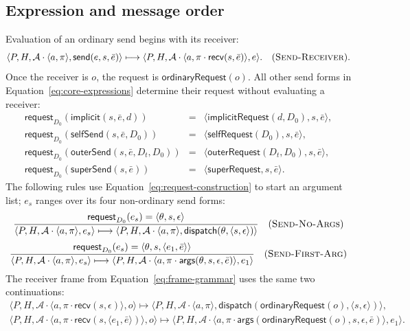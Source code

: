 \documentclass[11pt]{article}
\numberwithin{equation}{section}
\newcommand{\kw}[1]{\ensuremath{\mathsf{#1}}}
\newcommand{\rulelabel}[1]{\textsc{#1}}
\begin{document}
\subsection{Expression and message order}

Evaluation of an ordinary send begins with its receiver:
\[
 \langle P,H,\mathcal A\cdot\langle a,\pi\rangle,
        \kw{send}(e,s,\bar e)\rangle
 \longmapsto
 \langle P,H,\mathcal A\cdot\langle a,\pi\cdot\kw{recv}(s,\bar e)\rangle,
        e\rangle.
 \quad(\rulelabel{Send-Receiver}).
\]
Once the receiver is $o$, the request is $\kw{ordinaryRequest}(o)$.  All other send
forms in Equation~\eqref{eq:core-expressions} determine their request without
evaluating a receiver:
\begin{equation}\label{eq:request-construction}
\begin{array}{rcl}
 \mathsf{request}_{D_0}(\kw{implicit}(s,\bar e,d))
   &=&\langle\kw{implicitRequest}(d,D_0),s,\bar e\rangle,\\
 \mathsf{request}_{D_0}(\kw{selfSend}(s,\bar e,D_0))
   &=&\langle\kw{selfRequest}(D_0),s,\bar e\rangle,\\
 \mathsf{request}_{D_0}(\kw{outerSend}(s,\bar e,D_t,D_0))
   &=&\langle\kw{outerRequest}(D_t,D_0),s,\bar e\rangle,\\
 \mathsf{request}_{D_0}(\kw{superSend}(s,\bar e))
   &=&\langle\kw{superRequest},s,\bar e\rangle.
\end{array}
\end{equation}
The following rules use Equation~\eqref{eq:request-construction} to start an
argument list; $e_s$ ranges over its four non-ordinary send forms:
\[
\dfrac{\mathsf{request}_{D_0}(e_s)=\langle\theta,s,\epsilon\rangle}
 {\langle P,H,\mathcal A\cdot\langle a,\pi\rangle,e_s\rangle
  \longmapsto
  \langle P,H,\mathcal A\cdot\langle a,\pi\rangle,
          \kw{dispatch}(\theta,\langle s,\epsilon\rangle)\rangle}
\quad(\rulelabel{Send-No-Args})
\]
\[
\dfrac{\mathsf{request}_{D_0}(e_s)=
       \langle\theta,s,\langle e_1,\bar e\rangle\rangle}
 {\langle P,H,\mathcal A\cdot\langle a,\pi\rangle,e_s\rangle
  \longmapsto
  \langle P,H,\mathcal A\cdot
    \langle a,\pi\cdot\kw{args}(\theta,s,\epsilon,\bar e)\rangle,e_1\rangle}
\quad(\rulelabel{Send-First-Arg})
\]
The receiver frame from Equation~\eqref{eq:frame-grammar} uses the same two
continuations:
\begin{equation}\label{eq:receiver-continuations}
\begin{array}{c}
\langle P,H,\mathcal A\cdot\langle a,\pi\cdot\kw{recv}(s,\epsilon)\rangle,o\rangle
\longmapsto
\langle P,H,\mathcal A\cdot\langle a,\pi\rangle,
        \kw{dispatch}(\kw{ordinaryRequest}(o),\langle s,\epsilon\rangle)\rangle,
\\[2ex]
\langle P,H,\mathcal A\cdot
 \langle a,\pi\cdot\kw{recv}(s,\langle e_1,\bar e\rangle)\rangle,o\rangle
\longmapsto
\langle P,H,\mathcal A\cdot
 \langle a,\pi\cdot\kw{args}(\kw{ordinaryRequest}(o),s,\epsilon,\bar e)\rangle,e_1\rangle.
\end{array}
\end{equation}
\end{document}
